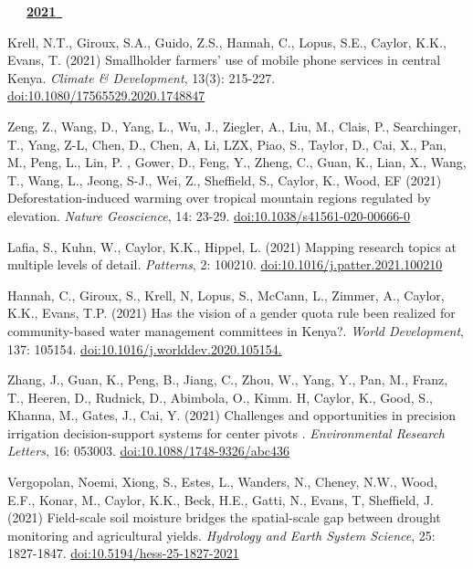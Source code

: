 
                                                                                

\mbox{\ \ \ \underline{\textbf{2021 }}}

\begin{etaremune}

\item Krell, N.T., Giroux, S.A., Guido, Z.S., Hannah, C., Lopus, S.E., Caylor, K.K., Evans, T. (2021) Smallholder farmers' use of mobile phone services in central Kenya. \emph{Climate \& Development}, 13(3): 215-227. \href{https://doi.org/10.1080/17565529.2020.1748847}{doi:10.1080/17565529.2020.1748847}
\item Zeng, Z., Wang, D., Yang, L., Wu, J., Ziegler, A., Liu, M., Clais, P., Searchinger, T., Yang, Z-L, Chen, D., Chen, A, Li, LZX, Piao, S., Taylor, D., Cai, X., Pan, M., Peng, L., Lin, P. , Gower, D., Feng, Y., Zheng, C., Guan, K., Lian, X., Wang, T., Wang, L., Jeong, S-J., Wei, Z., Sheffield, S., Caylor, K., Wood, EF (2021) Deforestation-induced warming over tropical mountain regions regulated by elevation. \emph{Nature Geoscience}, 14: 23-29. \href{https://doi.org/10.1038/s41561-020-00666-0}{doi:10.1038/s41561-020-00666-0}
\item Lafia, S., Kuhn, W., Caylor, K.K., Hippel, L. (2021) Mapping research topics at multiple levels of detail. \emph{Patterns}, 2: 100210. \href{https://doi.org/10.1016/j.patter.2021.100210}{doi:10.1016/j.patter.2021.100210}
\item Hannah, C., Giroux, S., Krell, N, Lopus, S., McCann, L., Zimmer, A., Caylor, K.K., Evans, T.P. (2021) Has the vision of a gender quota rule been realized for community-based water management committees in Kenya?. \emph{World Development}, 137: 105154. \href{https://doi.org/10.1016/j.worlddev.2020.105154.}{doi:10.1016/j.worlddev.2020.105154.}
\item Zhang, J., Guan, K., Peng, B., Jiang, C., Zhou, W., Yang, Y., Pan, M., Franz, T., Heeren, D., Rudnick, D., Abimbola, O., Kimm. H, Caylor, K., Good, S., Khanna, M., Gates, J., Cai, Y. (2021) Challenges and opportunities in precision irrigation decision-support systems for center pivots . \emph{Environmental Research Letters}, 16: 053003. \href{https://doi.org/10.1088/1748-9326/abc436}{doi:10.1088/1748-9326/abc436}
\item Vergopolan, Noemi, Xiong, S., Estes, L., Wanders, N., Cheney, N.W., Wood, E.F., Konar, M., Caylor, K.K., Beck, H.E., Gatti, N., Evans, T, Sheffield, J. (2021) Field-scale soil moisture bridges the spatial-scale gap between drought monitoring and agricultural yields. \emph{Hydrology and Earth System Science}, 25: 1827-1847. \href{https://doi.org/10.5194/hess-25-1827-2021}{doi:10.5194/hess-25-1827-2021}

\end{etaremune}
